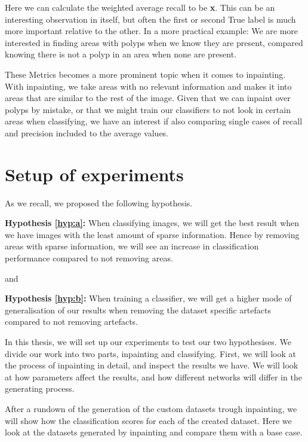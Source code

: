 Here we can calculate the weighted average recall to be \textbf{x}. This can be an interesting observation in itself, but often the first or second True label is much more important relative to the other.  In a more practical example: We are more interested in finding areas with polyps when we know they are present, compared knowing there is not a polyp in an area when none are present. 

These Metrics becomes a more prominent topic when it comes to inpainting. With inpainting, we take areas with no relevant information and makes it into areas that are similar to the rest of the image. Given that we can inpaint over polyps by mistake, or that we might train our classifiers to not look in certain areas when classifying, we have an interest if also comparing single cases of recall and precision included to the average values.





\section{Setup of experiments}
As we recall, we proposed the following hypothesis.
\vspace{10px}

\noindent
\textbf{Hypothesis \ref{hyp:a}:}
When classifying images, we will get the best result when we have images with the least amount of sparse information. 
Hence by removing areas with sparse information,
we will see an increase in classification performance compared to not removing areas.

\vspace{5px}
\noindent
and
\vspace{5px}

\noindent 
\textbf{Hypothesis \ref{hyp:b}:}
When training a classifier, we will get a higher
mode of generalisation of our results when removing the dataset
specific artefacts compared to not removing artefacts.
\vspace{5px}

In this thesis, we will set up our experiments to test our two hypothesises. 
We divide our work into two parts, inpainting and classifying. 
First, we will look at the process of inpainting in detail, and inspect the results we have.  
We will look at how parameters affect the results, and how different networks will differ in the generating process. 


After a rundown of the generation of the custom datasets trough inpainting, we will show how the classification scores for each of the created dataset. Here we look at the datasets generated by inpainting and compare them with a base case. 

